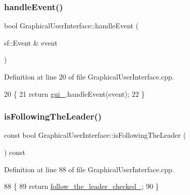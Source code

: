 \subsubsection{\texorpdfstring{handle\+Event()}{handleEvent()}}
{\footnotesize\ttfamily bool Graphical\+User\+Interface\+::handle\+Event (\begin{DoxyParamCaption}\item[{sf\+::\+Event \&}]{event }\end{DoxyParamCaption})}



Definition at line 20 of file Graphical\+User\+Interface.\+cpp.


\begin{DoxyCode}
20                                                       \{
21     \textcolor{keywordflow}{return} \hyperlink{classGraphicalUserInterface_ab07abda0fdb8e2965b70d2024fa3cf20}{gui\_}.handleEvent(event);
22 \}
\end{DoxyCode}
\mbox{\label{classGraphicalUserInterface_a9aa8920f70bf99225a7e8e4ff9cb5e3f}} 
\subsubsection{\texorpdfstring{is\+Following\+The\+Leader()}{isFollowingTheLeader()}}
{\footnotesize\ttfamily const bool Graphical\+User\+Interface\+::is\+Following\+The\+Leader (\begin{DoxyParamCaption}{ }\end{DoxyParamCaption}) const}



Definition at line 88 of file Graphical\+User\+Interface.\+cpp.


\begin{DoxyCode}
88                                                               \{
89     \textcolor{keywordflow}{return} \hyperlink{classGraphicalUserInterface_a57fe5ef98f53a222aab96d191e869ad3}{follow\_the\_leader\_checked\_};
90 \}
\end{DoxyCode}
\mbox{\label{classGraphicalUserInterface_ab0c8cd6460442a3ad01c304ec1216631}} 
